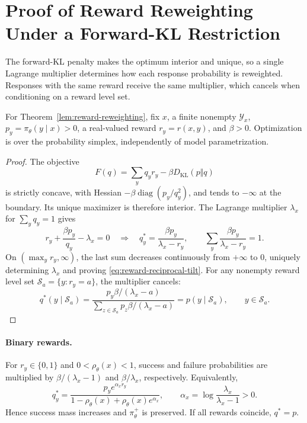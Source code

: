 \section{Proof of Reward Reweighting Under a Forward-KL Restriction}
\label{app:reward-reweighting}

\begin{insight}
The forward-KL penalty makes the optimum interior and unique, so a single
Lagrange multiplier determines how each response probability is reweighted.
Responses with the same reward receive the same multiplier, which cancels
when conditioning on a reward level set.
\end{insight}

For Theorem~\ref{lem:reward-reweighting}, fix $x$, a finite nonempty
$\mathcal Y_x$, $p_y=\pi_\theta(y\mid x)>0$, a real-valued reward
$r_y=r(x,y)$, and $\beta>0$. Optimization is over the probability simplex,
independently of model parametrization.

\begin{proof}
The objective
\begin{equation}
 F(q)=\sum_yq_yr_y-\beta D_{\mathrm{KL}}(p\Vert q)
 \label{eq:app-reward-forward-objective}
\end{equation}
is strictly concave, with Hessian
$-\beta\operatorname{diag}(p_y/q_y^2)$, and tends to $-\infty$ at the
boundary. Its unique maximizer is therefore interior. The Lagrange
multiplier $\lambda_x$ for $\sum_yq_y=1$ gives
\begin{equation}
 r_y+\frac{\beta p_y}{q_y}-\lambda_x=0
 \quad\Longrightarrow\quad
 q_y^*=\frac{\beta p_y}{\lambda_x-r_y},\qquad
 \sum_y\frac{\beta p_y}{\lambda_x-r_y}=1.
 \label{eq:app-reward-forward-stationarity}
\end{equation}
On $(\max_y r_y,\infty)$, the last sum decreases continuously from
$+\infty$ to $0$, uniquely determining $\lambda_x$ and proving
\eqref{eq:reward-reciprocal-tilt}. For any nonempty reward level set
$\mathcal S_a=\{y:r_y=a\}$, the multiplier cancels:
\begin{equation}
 q^*(y\mid\mathcal S_a)
 =\frac{p_y\beta/(\lambda_x-a)}
        {\sum_{z\in\mathcal S_a}p_z\beta/(\lambda_x-a)}
 =p(y\mid\mathcal S_a),\qquad y\in\mathcal S_a.
 \label{eq:app-reward-conditional-invariance}
\end{equation}
\end{proof}

\paragraph{Binary rewards.}
For $r_y\in\{0,1\}$ and $0<\rho_\theta(x)<1$, success and failure
probabilities are multiplied by $\beta/(\lambda_x-1)$ and
$\beta/\lambda_x$, respectively. Equivalently,
\begin{equation}
 q_y^*=\frac{p_y e^{\alpha_xr_y}}
 {1-\rho_\theta(x)+\rho_\theta(x)e^{\alpha_x}},
 \qquad \alpha_x=\log\frac{\lambda_x}{\lambda_x-1}>0.
 \label{eq:app-reward-binary-tilt}
\end{equation}
Hence success mass increases and $\pi_\theta^+$ is preserved.
If all rewards coincide, $q^*=p$.


